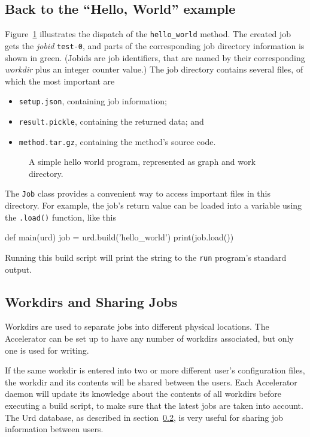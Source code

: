\subsection{Back to the ``Hello, World'' example}
Figure~\ref{fig:execflow-hello-world} illustrates the dispatch of the
\texttt{hello\_world} method.  The created job gets the \textsl{jobid}
\texttt{test-0}, and parts of the corresponding job directory
information is shown in green.  (Jobids are job identifiers, that are
named by their corresponding \textsl{workdir} plus an integer counter
value.)  The job directory contains several files, of which the most
important are
\begin{itemize}
\item[] \texttt{setup.json}, containing job information;
\item[] \texttt{result.pickle}, containing the returned data; and
\item[] \texttt{method.tar.gz}, containing the method's source code.
\end{itemize}

\begin{figure}[h!]
  \begin{center}
    
    \caption{A simple hello world program, represented as graph and
      work directory.}
    \label{fig:execflow-hello-world}
  \end{center}
\end{figure}

The \texttt{Job} class provides a convenient way to access important
files in this directory.  For example, the job's return value can be
loaded into a variable using the \texttt{.load()} function, like this
\begin{python}
def main(urd)
    job = urd.build('hello_world')
    print(job.load())
\end{python}
Running this build script will print the string to the \texttt{run}
program's standard output.



\subsection{Workdirs and Sharing Jobs}

Workdirs are used to separate jobs into different physical locations.
The Accelerator can be set up to have any number of workdirs
associated, but only one is used for writing.

If the same workdir is entered into two or more different user's
configuration files, the workdir and its contents will be shared
between the users.  Each Accelerator daemon will update its knowledge
about the contents of all workdirs before executing a build script, to
make sure that the latest jobs are taken into account.  The Urd
database, as described in section~\ref{}, is very useful for sharing
job information between users.


